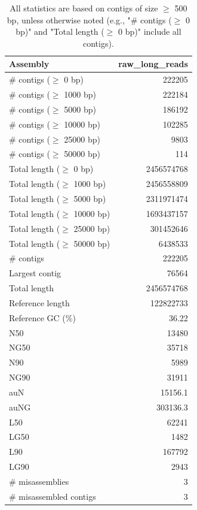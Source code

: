 \documentclass[12pt,a4paper]{article}
\begin{document}
\begin{table}[ht]
\begin{center}
\caption{All statistics are based on contigs of size $\geq$ 500 bp, unless otherwise noted (e.g., "\# contigs ($\geq$ 0 bp)" and "Total length ($\geq$ 0 bp)" include all contigs).}
\begin{tabular}{|l*{1}{|r}|}
\hline
Assembly & raw\_long\_reads \\ \hline
\# contigs ($\geq$ 0 bp) & 222205 \\ \hline
\# contigs ($\geq$ 1000 bp) & 222184 \\ \hline
\# contigs ($\geq$ 5000 bp) & 186192 \\ \hline
\# contigs ($\geq$ 10000 bp) & 102285 \\ \hline
\# contigs ($\geq$ 25000 bp) & 9803 \\ \hline
\# contigs ($\geq$ 50000 bp) & 114 \\ \hline
Total length ($\geq$ 0 bp) & 2456574768 \\ \hline
Total length ($\geq$ 1000 bp) & 2456558809 \\ \hline
Total length ($\geq$ 5000 bp) & 2311971474 \\ \hline
Total length ($\geq$ 10000 bp) & 1693437157 \\ \hline
Total length ($\geq$ 25000 bp) & 301452646 \\ \hline
Total length ($\geq$ 50000 bp) & 6438533 \\ \hline
\# contigs & 222205 \\ \hline
Largest contig & 76564 \\ \hline
Total length & 2456574768 \\ \hline
Reference length & 122822733 \\ \hline
Reference GC (\%) & 36.22 \\ \hline
N50 & 13480 \\ \hline
NG50 & 35718 \\ \hline
N90 & 5989 \\ \hline
NG90 & 31911 \\ \hline
auN & 15156.1 \\ \hline
auNG & 303136.3 \\ \hline
L50 & 62241 \\ \hline
LG50 & 1482 \\ \hline
L90 & 167792 \\ \hline
LG90 & 2943 \\ \hline
\# misassemblies & 3 \\ \hline
\# misassembled contigs & 3 \\ \hline

\end{tabular}
\end{center}
\end{table}
\end{document}
